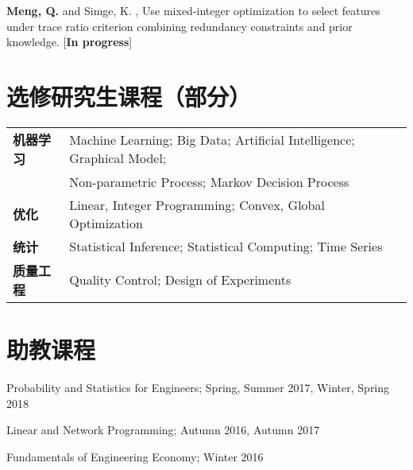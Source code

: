 \documentclass[margin,line,11pt]{resume}
\begin{document}
\begin{resume}
        \vspace{-0.5em}
        
       \textbf{Meng, Q.} and Simge, K. , Use mixed-integer optimization to select features under trace ratio criterion combining redundancy constraints and prior knowledge. [\textbf{In progress}]
        
                \vspace{-0.5em}\section{\mysidestyle 选修研究生课程（部分）}
\vspace{0.5em}
	\begin{tabular}{ll }
          \textbf{机器学习} & Machine Learning; Big Data; Artificial Intelligence; Graphical Model; \\
                           &  Non-parametric Process; Markov Decision Process\\
  \textbf{优化} & Linear, Integer Programming; Convex,  Global Optimization \\
   \textbf{统计}& Statistical Inference; Statistical Computing; Time Series \\
\textbf{质量工程} & Quality Control; Design of Experiments \\
	\end{tabular}

 


                \vspace{-0.5em}\section{\mysidestyle 助教课程}
        \begin{list2}
        \item   Probability and Statistics for Engineers; Spring, Summer 2017, Winter, Spring 2018 
        \item   Linear and Network Programming; Autumn 2016, Autumn 2017
        \item  Fundamentals of Engineering Economy; Winter 2016
        \end{list2}
        

\end{resume}
\end{document}
